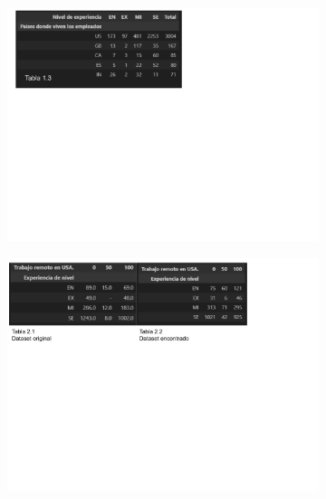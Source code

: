 \documentclass{article}
\begin{document}
	\begin{figure}[htbp] %
		\begin{subfigure}[b]{1.1\textwidth}
			\includegraphics[width=\textwidth]{FigurasTablas/tabla1.3.png}
			\label{tabla 1.3}
		\end{subfigure}
	
		\begin{subfigure}[b]{1.1\textwidth}
			\includegraphics[width=\textwidth]{FigurasTablas/tablasDinamicas2.1y2.2.png}
			\label{tablasDinamicas2.1y2.2}
		\end{subfigure}	
	\end{figure}
\end{document}
